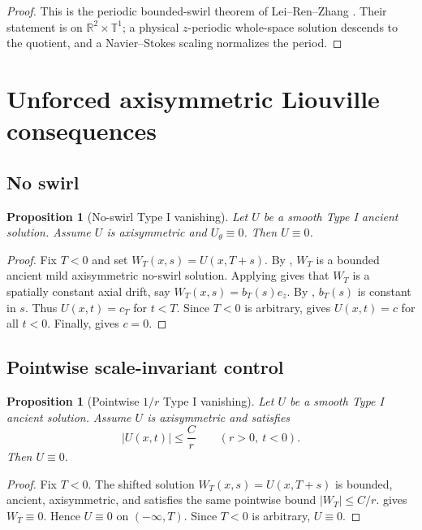 \documentclass[11pt]{amsart}
\theoremstyle{plain}
\newtheorem{proposition}[theorem]{Proposition}
\theoremstyle{definition}
\theoremstyle{remark}
\numberwithin{equation}{section}
\begin{document}
\begin{proof}
This is the periodic bounded-swirl theorem of Lei--Ren--Zhang
\cite{LRZ}.  Their statement is on \(\mathbb R^2\times\mathbb T^1\); a
physical \(z\)-periodic whole-space solution descends to the quotient, and a
Navier--Stokes scaling normalizes the period.
\end{proof}

\section{Unforced axisymmetric Liouville consequences}
\label{sec:axisymmetric-consequences}

\subsection{No swirl}

\begin{proposition}[No-swirl Type I vanishing]\label{prop:noswirl-typeI}
Let \(U\) be a smooth Type I ancient solution.  Assume \(U\) is axisymmetric
and \(U_\theta\equiv0\).  Then \(U\equiv0\).
\end{proposition}

\begin{proof}
Fix \(T<0\) and set \(W_T(x,s)=U(x,T+s)\).  By ,
\(W_T\) is a bounded ancient mild axisymmetric no-swirl solution.  Applying
 gives that \(W_T\) is a spatially constant axial
drift, say \(W_T(x,s)=b_T(s)e_z\).  By
, \(b_T(s)\) is constant in \(s\).  Thus
\(U(x,t)=c_T\) for \(t<T\).  Since \(T<0\) is arbitrary,
 gives \(U(x,t)=c\) for all \(t<0\).  Finally,
 gives \(c=0\).
\end{proof}

\subsection{Pointwise scale-invariant control}

\begin{proposition}[Pointwise \(1/r\) Type I vanishing]\label{prop:pointwise-typeI}
Let \(U\) be a smooth Type I ancient solution.  Assume \(U\) is axisymmetric
and satisfies
\[
   |U(x,t)|\le \frac{C}{r}
   \qquad(r>0,\ t<0).
\]
Then \(U\equiv0\).
\end{proposition}

\begin{proof}
Fix \(T<0\).  The shifted solution \(W_T(x,s)=U(x,T+s)\) is bounded, ancient,
axisymmetric, and satisfies the same pointwise bound \(|W_T|\le C/r\).
 gives \(W_T\equiv0\).  Hence \(U\equiv0\) on
\((-\infty,T)\).  Since \(T<0\) is arbitrary, \(U\equiv0\).
\end{proof}
\end{document}
